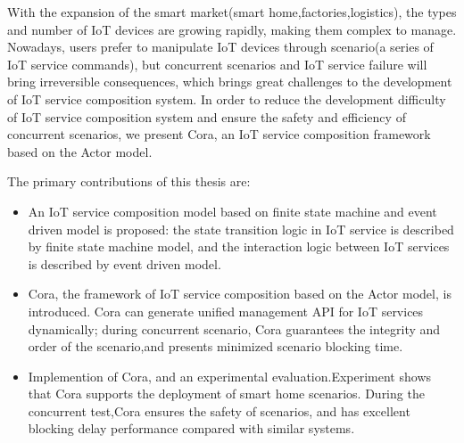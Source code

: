 \documentclass[winfonts,master,twoside]{njuthesis}
\begin{document}
\begin{englishabstract}
With the expansion of the smart market(smart home,factories,logistics), the types and number of IoT devices are growing rapidly, making them complex to manage. Nowadays, users prefer to manipulate IoT devices through scenario(a series of IoT service commands), but concurrent scenarios and IoT service failure will bring irreversible consequences, which brings great challenges to the development of IoT service composition system. In order to reduce the development difficulty of IoT service composition system and ensure the safety and efficiency of concurrent scenarios, we present Cora, an IoT service composition framework based on the Actor model.

The primary contributions of this thesis are:
\begin{itemize}
    \item An IoT service composition model based on finite state machine and event driven model is proposed: the state transition logic in IoT service is described by finite state machine model, and the interaction logic between IoT services is described by event driven model.
    \item Cora, the framework of IoT service composition based on the Actor model, is introduced. Cora can generate unified management API for IoT services dynamically; during concurrent scenario, Cora guarantees the integrity and order of the scenario,and presents minimized scenario blocking time.
    \item Implemention of Cora, and an experimental evaluation.Experiment shows that Cora supports the deployment of smart home scenarios. During the concurrent test,Cora ensures the safety of scenarios, and has excellent blocking delay performance compared with similar systems.
\end{itemize}


\end{englishabstract}

\tableofcontents

\listoffigures
\end{document}
